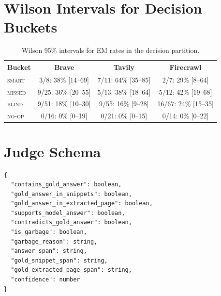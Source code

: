 \documentclass[11pt]{article}
\newcommand{\smart}{\textsc{smart}}
\newcommand{\missed}{\textsc{missed}}
\newcommand{\blind}{\textsc{blind}}
\newcommand{\noop}{\textsc{no-op}}
\begin{document}
\section{Wilson Intervals for Decision Buckets}
\label{app:wilson}
\begin{table}[h]
\centering
\small
\begin{tabular}{lccc}
\toprule
\textbf{Bucket} & \textbf{Brave} & \textbf{Tavily} & \textbf{Firecrawl} \\
\midrule
\smart{} & 3/8: 38\% [14--69] & 7/11: 64\% [35--85] & 2/7: 29\% [8--64] \\
\missed{} & 9/25: 36\% [20--55] & 5/13: 38\% [18--64] & 5/12: 42\% [19--68] \\
\blind{} & 9/51: 18\% [10--30] & 9/55: 16\% [9--28] & 16/67: 24\% [15--35] \\
\noop{} & 0/16: 0\% [0--19] & 0/21: 0\% [0--15] & 0/14: 0\% [0--22] \\
\bottomrule
\end{tabular}
\caption{Wilson 95\% intervals for EM rates in the decision partition.}
\end{table}

\section{Judge Schema}
\label{app:judge-schema}
\begin{small}
\begin{verbatim}
{
  "contains_gold_answer": boolean,
  "gold_answer_in_snippets": boolean,
  "gold_answer_in_extracted_page": boolean,
  "supports_model_answer": boolean,
  "contradicts_gold_answer": boolean,
  "is_garbage": boolean,
  "garbage_reason": string,
  "answer_span": string,
  "gold_snippet_span": string,
  "gold_extracted_page_span": string,
  "confidence": number
}
\end{verbatim}
\end{small}
\end{document}
